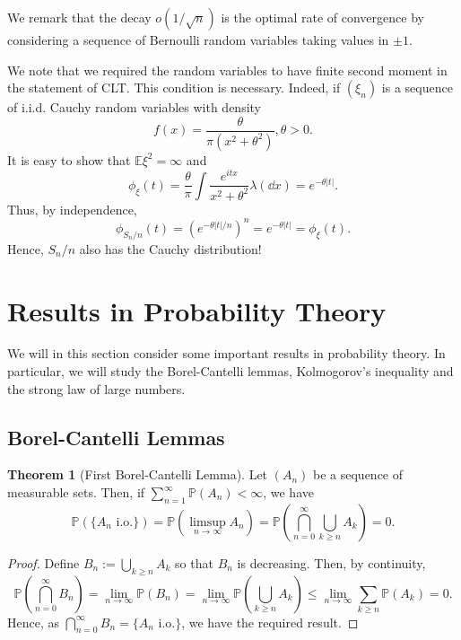 \documentclass[]{article}
\theoremstyle{definition}
\newtheorem{theorem}{Theorem}
\theoremstyle{definition}
\begin{document}
We remark that the decay \(o(1 / \sqrt{n})\) is the optimal rate of convergence
by considering a sequence of Bernoulli random variables taking values in \(\pm 1\).

We note that we required the random variables to have finite second moment 
in the statement of CLT. This condition is necessary. Indeed, if 
\((\xi_n)\) is a sequence of i.i.d. Cauchy random variables with density 
\[f(x) = \frac{\theta}{\pi(x^2 + \theta^2)}, \theta > 0.\]
It is easy to show that \(\mathbb{E}\xi^2 = \infty\) and 
\[\phi_\xi(t) = \frac{\theta}{\pi} \int \frac{e^{itx}}{x^2 + \theta^2} \lambda(\dd x) 
  = e^{- \theta|t|}.\]
Thus, by independence, 
\[\phi_{S_n / n}(t) = \left(e^{-\theta|t| / n}\right)^n = e^{-\theta|t|} = \phi_\xi(t).\]
Hence, \(S_n / n\) also has the Cauchy distribution!

\newpage
\section{Results in Probability Theory}

We will in this section consider some important results in probability theory. 
In particular, we will study the Borel-Cantelli lemmas, Kolmogorov's inequality 
and the strong law of large numbers.

\subsection{Borel-Cantelli Lemmas}

\begin{theorem}[First Borel-Cantelli Lemma]
  Let \((A_n)\) be a sequence of measurable sets. Then, if 
  \(\sum_{n = 1}^\infty \mathbb{P}(A_n) < \infty\), we have 
  \[\mathbb{P}(\{A_n \text{ i.o.}\}) = 
    \mathbb{P}\left(\limsup_{n \to \infty} A_n\right)
    = \mathbb{P}\left(\bigcap_{n = 0}^\infty \bigcup_{k \ge n} A_k\right) = 0.\]
\end{theorem}
\begin{proof}
  Define \(B_n := \bigcup_{k \ge n} A_k\) so that \(B_n\) is decreasing. Then, 
  by continuity, 
  \[\mathbb{P}\left(\bigcap_{n = 0}^\infty B_n\right) = 
    \lim_{n \to \infty} \mathbb{P}(B_n) = 
    \lim_{n \to \infty}\mathbb{P}\left(\bigcup_{k \ge n} A_k\right)
    \le \lim_{n \to \infty} \sum_{k \ge n} \mathbb{P}(A_k) = 0.\]
  Hence, as \(\bigcap_{n = 0}^\infty B_n = \{A_n \text{ i.o.}\}\), we have the 
  required result. 
\end{proof}
\end{document}
